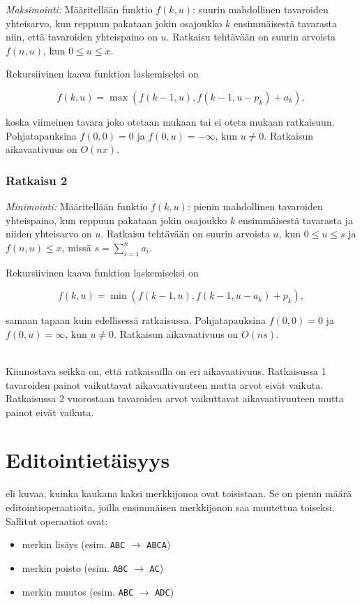 \textit{Maksimointi:} Määritellään funktio $f(k,u)$:
suurin mahdollinen tavaroiden
yhteisarvo, kun reppuun pakataan jokin osajoukko
$k$ ensimmäisestä tavarasta
niin, että tavaroiden yhteispaino on $u$.
Ratkaisu tehtävään on suurin arvoista
$f(n,u)$, kun $0 \le u \le x$.

Rekursiivinen kaava funktion laskemiseksi on

\[f(k,u) = \max(f(k-1,u),f(k-1,u-p_k)+a_k),\]

koska viimeinen tavara joko otetaan mukaan tai ei
oteta mukaan ratkaisuun.
Pohjatapauksina $f(0,0)=0$ ja $f(0,u)=-\infty$,
kun $u \neq 0$. Ratkaisun aikavaativuus on $O(nx)$.

\subsubsection{Ratkaisu 2}

\textit{Minimointi:} Määritellään funktio $f(k,u)$:
pienin mahdollinen tavaroiden yhteispaino,
kun reppuun pakataan jokin osajoukko
$k$ ensimmäisestä tavarasta ja niiden yhteisarvo on $u$.
Ratkaisu tehtävään on suurin arvoista
$u$, kun $0 \le u \le s$ ja $f(n,u) \le x$,
missä $s=\sum_{i=1}^n a_i$.

Rekursiivinen kaava funktion laskemiseksi on

\[f(k,u) = \min(f(k-1,u),f(k-1,u-a_k)+p_k),\]

samaan tapaan kuin edellisessä ratkaisussa.
Pohjatapauksina $f(0,0)=0$ ja $f(0,u)=\infty$, kun $u \neq 0$.
Ratkaisun aikavaativuus on $O(ns)$.


~\\
\noindent
Kiinnostava seikka on, että ratkaisuilla on eri aikavaativuus.
Ratkaisussa 1 tavaroiden painot vaikuttavat aikavaativuuteen
mutta arvot eivät vaikuta.
Ratkaisussa 2 vuorostaan tavaroiden arvot vaikuttavat aikavaativuuteen
mutta painot eivät vaikuta.

\section{Editointietäisyys}


 eli
kuvaa, kuinka kaukana kaksi merkkijonoa ovat toisistaan.
Se on pienin määrä editointioperaatioita,
joilla ensimmäisen merkkijonon saa muutettua toiseksi.
Sallitut operaatiot ovat:
\begin{itemize}
\item merkin lisäys (esim. \texttt{ABC} $\rightarrow$ \texttt{ABCA})
\item merkin poisto (esim. \texttt{ABC} $\rightarrow$ \texttt{AC})
\item merkin muutos (esim. \texttt{ABC} $\rightarrow$ \texttt{ADC})
\end{itemize}


